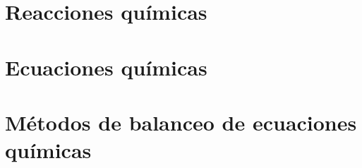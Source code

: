 


\section{Reacciones químicas}



\section{Ecuaciones químicas}



\section{Métodos de balanceo de ecuaciones químicas}





\putbib